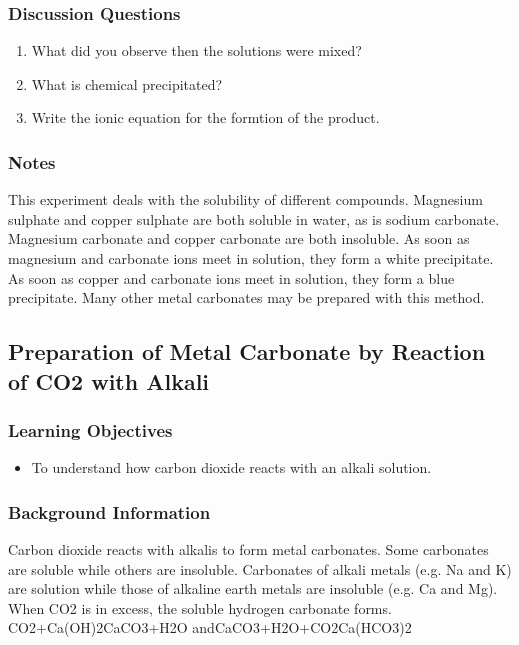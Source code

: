\subsubsection*{Discussion Questions}
\begin{enumerate}
\item{What did you observe then the solutions were mixed?}
\item{What is chemical precipitated?}
\item{Write the ionic equation for the formtion of the product.}
\end{enumerate}

\subsubsection*{Notes}
This experiment deals with the solubility of different compounds. Magnesium sulphate and copper sulphate are both soluble in water, as is sodium carbonate. Magnesium carbonate and copper carbonate are both insoluble. As soon as magnesium and carbonate ions meet in solution, they form a white precipitate. As soon as copper and carbonate ions meet in solution, they form a blue precipitate. Many other metal carbonates may be prepared with this method.

\subsection{Preparation of Metal Carbonate by Reaction of CO2 with Alkali}

\subsubsection*{Learning Objectives}
\begin{itemize}
\item{To understand how carbon dioxide reacts with an alkali solution.}
\end{itemize}

\subsubsection*{Background Information}
Carbon dioxide reacts with alkalis to form metal carbonates. Some carbonates are soluble while others are insoluble. Carbonates of alkali metals (e.g. Na and K) are solution while those of alkaline earth metals are insoluble (e.g. Ca and Mg). When CO2 is in excess, the soluble hydrogen carbonate forms.
CO2+Ca(OH)2CaCO3+H2O
andCaCO3+H2O+CO2Ca(HCO3)2

